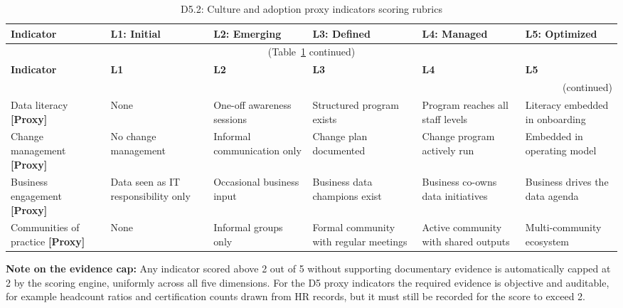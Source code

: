 \begin{center}
{\small
\begin{longtable}{|p{2.4cm}|p{2.0cm}|p{2.0cm}|p{2.2cm}|p{2.2cm}|p{2.2cm}|}
\caption{D5.2: Culture and adoption proxy indicators scoring rubrics} \label{tab:d5-2} \\
\hline
\textbf{Indicator} & \textbf{L1: Initial} & \textbf{L2: Emerging} & \textbf{L3: Defined} & \textbf{L4: Managed} & \textbf{L5: Optimized} \\
\hline
\endfirsthead
\multicolumn{6}{c}{\small (Table~\ref{tab:d5-2} continued)} \\
\hline
\textbf{Indicator} & \textbf{L1} & \textbf{L2} & \textbf{L3} & \textbf{L4} & \textbf{L5} \\
\hline
\endhead
\hline
\multicolumn{6}{r}{\small (continued)} \\
\endfoot
\hline
\endlastfoot
Data literacy \textbf{[Proxy]} &
  None &
  One-off awareness sessions &
  Structured program exists &
  Program reaches all staff levels &
  Literacy embedded in onboarding \\
\hline
Change management \textbf{[Proxy]} &
  No change management &
  Informal communication only &
  Change plan documented &
  Change program actively run &
  Embedded in operating model \\
\hline
Business engagement \textbf{[Proxy]} &
  Data seen as IT responsibility only &
  Occasional business input &
  Business data champions exist &
  Business co-owns data initiatives &
  Business drives the data agenda \\
\hline
Communities of practice \textbf{[Proxy]} &
  None &
  Informal groups only &
  Formal community with regular meetings &
  Active community with shared outputs &
  Multi-community ecosystem \\
\hline
\end{longtable}
}
\end{center}

\vspace{1em}
\noindent \textbf{Note on the evidence cap:} Any indicator scored above 2 out of 5 without supporting documentary evidence is automatically capped at 2 by the scoring engine, uniformly across all five dimensions. For the D5 proxy indicators the required evidence is objective and auditable, for example headcount ratios and certification counts drawn from HR records, but it must still be recorded for the score to exceed 2.
